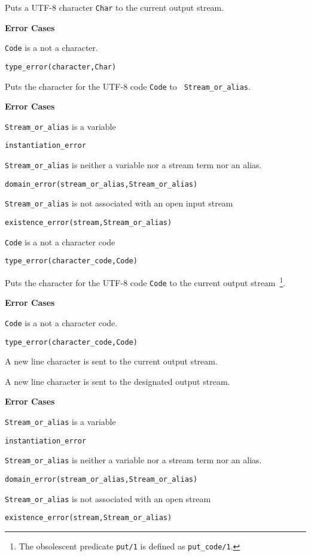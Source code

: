 \begin{description}
%
Puts a UTF-8 character {\tt Char} to the current output stream.

{\bf Error Cases}
\bi
\item 	{\tt Code} is a not a character.
\bi
\item 	{\tt type\_error(character,Char)}
\ei
\ei

%
Puts the character for the UTF-8 code {\tt Code} to {\tt
  Stream\_or\_alias}.

{\bf Error Cases}
\bi
\item 	{\tt Stream\_or\_alias} is a variable
\bi
\item {\tt instantiation\_error}
\ei
\item 	{\tt Stream\_or\_alias} is neither a variable nor a stream term nor an alias.
\bi
\item 	{\tt domain\_error(stream\_or\_alias,Stream\_or\_alias)}
\ei
\item 	{\tt Stream\_or\_alias} is not associated with an open input stream
\bi
\item 	{\tt existence\_error(stream,Stream\_or\_alias)}
\ei
\item 	{\tt Code} is a not a character code
\bi
\item 	{\tt type\_error(character\_code,Code)}
\ei
\ei


%
Puts the character for the UTF-8 code {\tt Code} to the current output
stream~\footnote{The obsolescent predicate {\tt put/1} is defined as
  {\tt put\_code/1}.}.

{\bf Error Cases} \bi
\item 	{\tt Code} is a not a character code.
\bi
\item 	{\tt type\_error(character\_code,Code)}
\ei
\ei

%

A new line character is sent to the current output stream.

A new line character is sent to the designated output stream.

{\bf Error Cases}
\bi
\item 	{\tt Stream\_or\_alias} is a variable
\bi
\item {\tt instantiation\_error}
\ei
\item 	{\tt Stream\_or\_alias} is neither a variable nor a stream term nor an alias.
\bi
\item 	{\tt domain\_error(stream\_or\_alias,Stream\_or\_alias)}
\ei
\item 	{\tt Stream\_or\_alias} is not associated with an open stream
\bi
\item 	{\tt existence\_error(stream,Stream\_or\_alias)}
\ei
\ei


\end{description}
